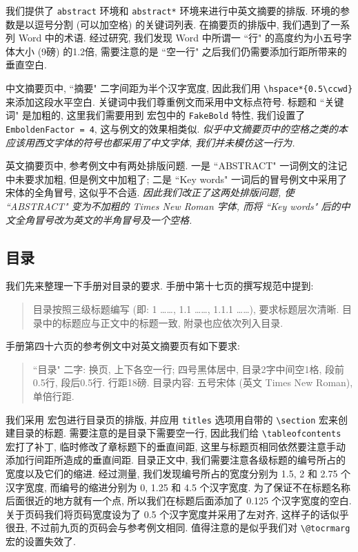 我们提供了 \verb|abstract| 环境和 \verb|abstract*| 环境来进行中英文摘要的排版. 环境的参数是以逗号分割 (可以加空格) 的关键词列表. 在摘要页的排版中, 我们遇到了一系列 Word 中的术语. 经过研究, 我们发现 Word 中所谓一 ``行" 的高度约为小五号字体大小 (9磅) 的1.2倍, 需要注意的是 ``空一行" 之后我们仍需要添加行距所带来的垂直空白.

中文摘要页中, ``摘要" 二字间距为半个汉字宽度, 因此我们用 \verb|\hspace*{0.5\ccwd}| 来添加这段水平空白. 关键词中我们尊重例文而采用中文标点符号. 标题和 ``关键词" 是加粗的, 这里我们需要用到  宏包中的 \verb|FakeBold| 特性, 我们设置了 \verb|EmboldenFactor = 4|, 这与例文的效果相类似. \emph{似乎中文摘要页中的空格之类的本应该用西文字体的符号也都采用了中文字体, 我们并未模仿这一行为.}

英文摘要页中, 参考例文中有两处排版问题. 一是 ``ABSTRACT" 一词例文的注记中未要求加粗, 但是例文中加粗了; 二是 ``Key words" 一词后的冒号例文中采用了宋体的全角冒号, 这似乎不合适. \emph{因此我们改正了这两处排版问题, 使 ``ABSTRACT" 变为不加粗的 Times New Roman 字体, 而将 ``Key words" 后的中文全角冒号改为英文的半角冒号及一个空格.}

\subsection{目录}

我们先来整理一下手册对目录的要求. 手册中第十七页的撰写规范中提到:
\begin{quote}
  目录按照三级标题编写 (即: 1 \dots\dots, 1.1 \dots\dots, 1.1.1 \dots\dots), 要求标题层次清晰. 目录中的标题应与正文中的标题一致, 附录也应依次列入目录.
\end{quote}
手册第四十六页的参考例文中对英文摘要页有如下要求:
\begin{quote}
  ``目录" 二字: 换页, 上下各空一行; 四号黑体居中, 目录2字中间空1格, 段前0.5行, 段后0.5行. 行距18磅.
  目录内容: 五号宋体 (英文 Times New Roman), 单倍行距.
\end{quote}

我们采用  宏包进行目录页的排版, 并应用 \verb|titles| 选项用自带的 \verb|\section| 宏来创建目录的标题. 需要注意的是目录下需要空一行, 因此我们给 \verb|\tableofcontents| 宏打了补丁, 临时修改了章标题下的垂直间距, 这里与标题页相同依然要注意手动添加行间距所造成的垂直间距. 目录正文中, 我们需要注意各级标题的编号所占的宽度以及它们的缩进. 经过测量, 我们发现编号所占的宽度分别为 1.5, 2 和 2.75 个汉字宽度, 而编号的缩进分别为 0, 1.25 和 4.5 个汉字宽度. 为了保证不在标题名称后面很近的地方就有一个点, 所以我们在标题后面添加了 0.125 个汉字宽度的空白. 关于页码我们将页码宽度设为了 0.5 个汉字宽度并采用了左对齐, 这样子的话似乎很丑, 不过前九页的页码会与参考例文相同. 值得注意的是似乎我们对 \verb|\@tocrmarg| 宏的设置失效了.

